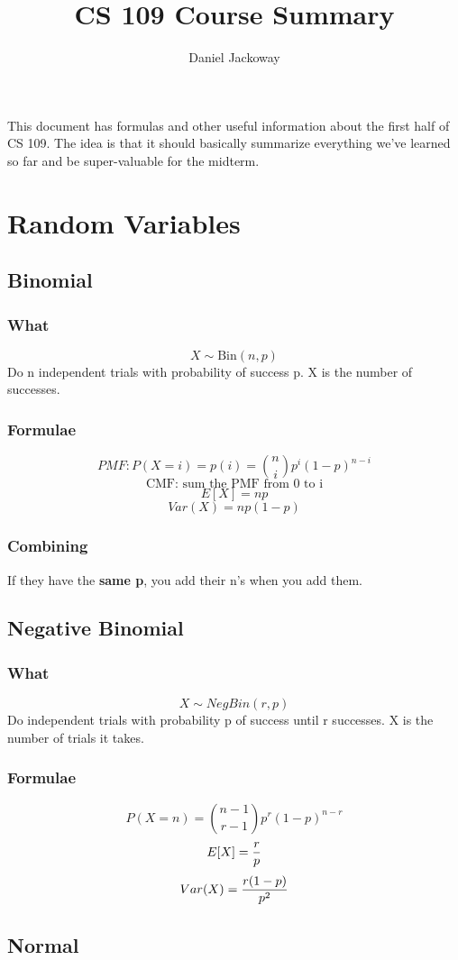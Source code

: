 \documentclass[12pt]{amsart}
\title{CS 109 Course Summary}
\author{Daniel Jackoway}
\begin{document}
\maketitle

This document has formulas and other useful information about the first half of CS 109. The idea is that it should basically summarize everything we've learned so far and be super-valuable for the midterm.

\section{Random Variables}
%
\subsection{Binomial}
\subsubsection{What}
\[
X \sim \text{Bin}(n,p)
\]
Do n independent trials with probability of success p. X is the number of successes.
\subsubsection{Formulae}
\[
PMF: P(X = i) = p(i) = {n \choose i} p^i (1-p)^{n-i}
\]
\[
\text{CMF: sum the PMF from 0 to i}
\]
\[
E[X] = np
\]
\[
Var(X) = np(1-p)
\]
\subsubsection{Combining}
If they have the \textbf{same p}, you add their n's when you add them.
%
\subsection{Negative Binomial}
\subsubsection{What}
\[
X \sim NegBin(r, p)
\]
Do independent trials with probability p of success until r successes. X is the number of trials it takes.
\subsubsection{Formulae}
\[
P(X = n) = {n - 1 \choose r - 1} p^r (1-p)^{n-r}
\]
\[
E[X] = {r \over p}
\]
\[
Var(X) = {r(1-p) \over p^2}
\]
%
\subsection{Normal}
\end{document}
